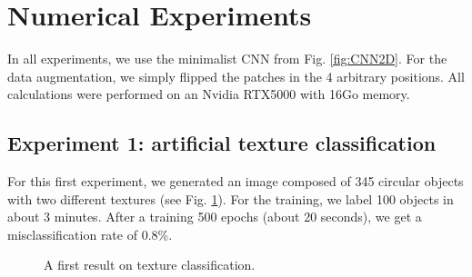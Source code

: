 \documentclass{article}
\begin{document}
\section{Numerical Experiments}
\label{sec:experiments}

In all experiments, we use the minimalist CNN from Fig. \ref{fig:CNN2D}. 
For the data augmentation, we simply flipped the patches in the 4 arbitrary positions.
All calculations were performed on an Nvidia RTX5000 with 16Go memory.

\subsection{Experiment 1: artificial texture classification}

For this first experiment, we generated an image composed of  345 circular objects with two different textures (see Fig. \ref{fig:textures}). 
For the training, we label 100 objects in about 3 minutes. 
After a training 500 epochs (about 20 seconds), we get a misclassification rate of 0.8\%.

\begin{figure}[h!]
  \begin{center}
     \quad 
     \end{center}
\caption{A first result on texture classification. \label{fig:textures}}
\end{figure}
\end{document}

